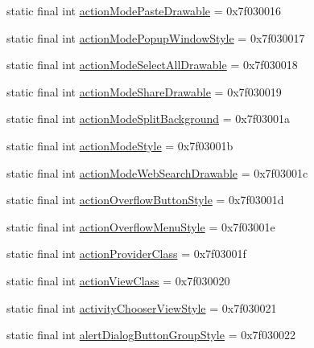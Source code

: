 \begin{DoxyCompactItemize}
\item 
static final int \mbox{\hyperlink{classcom_1_1google_1_1android_1_1gms_1_1R_1_1attr_a7c6325fe337c7309105f7a7520c6eabc}{action\+Mode\+Paste\+Drawable}} = 0x7f030016
\item 
static final int \mbox{\hyperlink{classcom_1_1google_1_1android_1_1gms_1_1R_1_1attr_afc8307a50321a0d01aa28b0b49d8ed09}{action\+Mode\+Popup\+Window\+Style}} = 0x7f030017
\item 
static final int \mbox{\hyperlink{classcom_1_1google_1_1android_1_1gms_1_1R_1_1attr_a08de25a2dd1ea11b9c37bf5ad44070ab}{action\+Mode\+Select\+All\+Drawable}} = 0x7f030018
\item 
static final int \mbox{\hyperlink{classcom_1_1google_1_1android_1_1gms_1_1R_1_1attr_a69af16206e1091bb59c539aeb6af9b22}{action\+Mode\+Share\+Drawable}} = 0x7f030019
\item 
static final int \mbox{\hyperlink{classcom_1_1google_1_1android_1_1gms_1_1R_1_1attr_ad1e5f8f7085e2f9db18f0389f9e8ea43}{action\+Mode\+Split\+Background}} = 0x7f03001a
\item 
static final int \mbox{\hyperlink{classcom_1_1google_1_1android_1_1gms_1_1R_1_1attr_ac993d5bfcf4b60aa6f3f822f433e765e}{action\+Mode\+Style}} = 0x7f03001b
\item 
static final int \mbox{\hyperlink{classcom_1_1google_1_1android_1_1gms_1_1R_1_1attr_aff4a2980754d573f930a7119a50bc92c}{action\+Mode\+Web\+Search\+Drawable}} = 0x7f03001c
\item 
static final int \mbox{\hyperlink{classcom_1_1google_1_1android_1_1gms_1_1R_1_1attr_aa180c91925a7e7dc36fd0358853f4d7b}{action\+Overflow\+Button\+Style}} = 0x7f03001d
\item 
static final int \mbox{\hyperlink{classcom_1_1google_1_1android_1_1gms_1_1R_1_1attr_a0a77b115b4d1fdfad5effb7167575202}{action\+Overflow\+Menu\+Style}} = 0x7f03001e
\item 
static final int \mbox{\hyperlink{classcom_1_1google_1_1android_1_1gms_1_1R_1_1attr_add85a90344d09a6332250394505aad46}{action\+Provider\+Class}} = 0x7f03001f
\item 
static final int \mbox{\hyperlink{classcom_1_1google_1_1android_1_1gms_1_1R_1_1attr_aa330000aee71b4780bd6c40254e2685f}{action\+View\+Class}} = 0x7f030020
\item 
static final int \mbox{\hyperlink{classcom_1_1google_1_1android_1_1gms_1_1R_1_1attr_a2ba911a04f31efb883a9e09259f760a4}{activity\+Chooser\+View\+Style}} = 0x7f030021
\item 
static final int \mbox{\hyperlink{classcom_1_1google_1_1android_1_1gms_1_1R_1_1attr_ae405b70d379a794e6b73ca657f339976}{alert\+Dialog\+Button\+Group\+Style}} = 0x7f030022

\end{DoxyCompactItemize}
